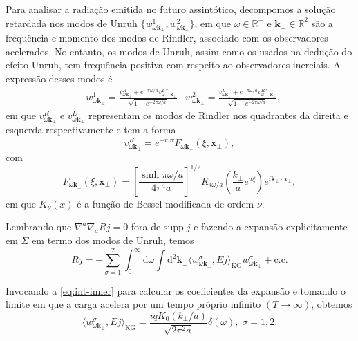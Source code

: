 \documentclass[12pt]{article}
\newcommand{\dd}{\mathrm{d}}
\newcommand{\innerkg}[2]{\langle#1,#2\rangle_{\text{KG}}}
\newcommand{\xperp}{\mathbf{x}_{\perp}}
\newcommand{\supp}[1]{\text{supp}\;#1}
\newcommand{\wu}[1]{w^1_{#1\mathbf{k}_\perp}}
\newcommand{\wv}[1]{w^2_{#1\mathbf{k}_\perp}}
\newcommand{\wsig}[1]{w^{\sigma}_{#1\mathbf{k}_\perp}}
\begin{document}
Para analisar a radiação emitida no futuro assintótico, decompomos a solução retardada nos modos de Unruh \(\{\wu{\omega},\wv{\omega}\}\), em que \(\omega\in\mathbb{R}^+\) e \(\mathbf{k}_\perp\in\mathbb{R}^2\) são a frequência e momento dos modos de Rindler, associado com os observadores acelerados. No entanto, os modos de Unruh, assim como os usados na dedução do efeito Unruh, tem frequência positiva com respeito ao observadores inerciais. A expressão desses modos é
\begin{subequations}
    \begin{align}
        &\wu{\omega}=\frac{v^R_{\omega\mathbf{k}_\perp}+e^{-\pi\omega/a}v^{L*}_{\omega-\mathbf{k}_\perp}}{\sqrt{1-e^{-2\pi\omega/a}}}
        &\wv{\omega}=\frac{v^L_{\omega\mathbf{k}_\perp}+e^{-\pi\omega/a}v^{R*}_{\omega-\mathbf{k}_\perp}}{\sqrt{1-e^{-2\pi\omega/a}}},
    \end{align}
\end{subequations}
em que \(v^R_{\omega\mathbf{k}_\perp}\) e \(v^L_{\omega\mathbf{k}_\perp}\) representam os modos de Rindler nos quadrantes da direita e esquerda respectivamente e tem a forma
\begin{equation}
    v^R_{\omega\mathbf{k}_\perp}=e^{-i\omega\tau}F_{\omega\mathbf{k}_\perp}(\xi,\xperp),
\end{equation}
com
\begin{equation}
    F_{\omega\mathbf{k}_\perp}(\xi,\xperp)=\left[\frac{\sinh{\pi\omega/a}}{4\pi^4a}\right]^{1/2}K_{i\omega/a}\left(\frac{k_\perp}{a}e^{a\xi}\right)e^{i\mathbf{k}_\perp\cdot\xperp},
\end{equation}
em que \(K_\nu(x)\) é a função de Bessel modificada de ordem \(\nu\).

Lembrando que \(\nabla^a\nabla_aRj=0\) fora de \(\supp{j}\) e fazendo a expansão explicitamente em \(\Sigma\) em termo dos modos de Unruh, temos
\begin{equation}
    Rj=-\sum_{\sigma=1}^2\int_0^{\infty}\dd\omega\int\dd^2\mathbf{k}_\perp\innerkg{\wsig{\omega}}{Ej}\wsig{\omega}+\text{c.c.}
\end{equation}

Invocando a \cref{eq:int-inner} para calcular os coeficientes da expansão e tomando o limite em que a carga acelera por um tempo próprio infinito \((T\to\infty)\), obtemos
\begin{equation}
    \innerkg{\wsig{\omega}}{Ej}=\frac{iqK_0(k_\perp/a)}{\sqrt{2\pi^2a}}\delta(\omega),\;\sigma=1,2.
\end{equation}
\end{document}
